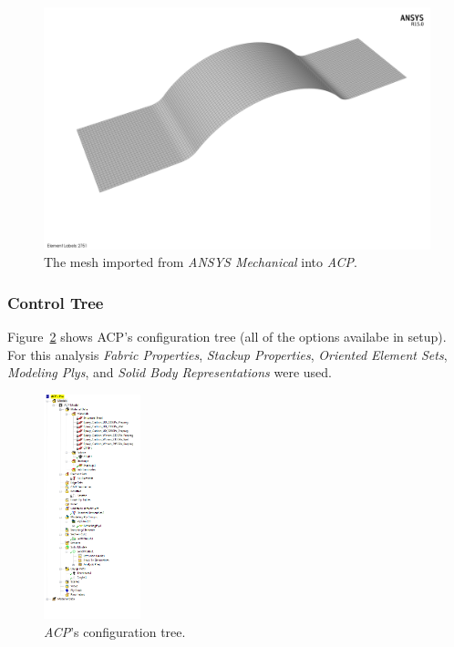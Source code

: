 \begin{figure}[htp]
\centering
\includegraphics[width=1\textwidth]{./figures/fea/fea-acp-mesh-overview}
\caption{The mesh imported from \textit{ANSYS Mechanical} into \textit{ACP}.}
\label{fig:fea-acp-mesh-overview}
\end{figure}

\clearpage

\subsubsection{Control Tree}

\indent

Figure~\ref{fig:fea-acp-tree} shows ACP's configuration tree (all of the options availabe in setup). For this analysis \emph{Fabric Properties}, \emph{Stackup Properties}, \emph{Oriented Element Sets}, \emph{Modeling Plys}, and \emph{Solid Body Representations} were used.\\

\begin{figure}[htp]
\centering
\includegraphics[width=0.25\textwidth]{./figures/fea/fea-acp-tree}
\caption{\textit{ACP}'s configuration tree.}
\label{fig:fea-acp-tree}
\end{figure}

